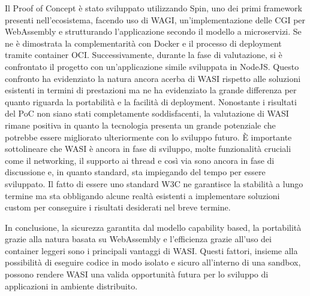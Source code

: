 Il Proof of Concept è stato sviluppato utilizzando Spin, uno dei primi framework presenti nell'ecosistema, facendo uso
di WAGI, un'implementazione delle CGI per WebAssembly e strutturando l'applicazione secondo il modello a microservizi.
Se ne è dimostrata la complementarità con Docker e il processo di deployment tramite container OCI. Successivamente,
durante la fase di valutazione, si è confrontato il progetto con un'applicazione simile sviluppata in NodeJS. Questo
confronto ha evidenziato la natura ancora acerba di WASI rispetto alle soluzioni esistenti in termini di prestazioni ma
ne ha evidenziato la grande differenza per quanto riguarda la portabilità e la facilità di deployment. Nonostante i
risultati del PoC non siano stati completamente soddisfacenti, la valutazione di WASI rimane positiva in quanto la
tecnologia presenta un grande potenziale che potrebbe essere migliorato ulteriormente con lo sviluppo futuro. È
importante sottolineare che WASI è ancora in fase di sviluppo, molte funzionalità cruciali come il networking, il
supporto ai thread e così via sono ancora in fase di discussione e, in quanto standard, sta impiegando del tempo per
essere sviluppato. Il fatto di essere uno standard W3C ne garantisce la stabilità a lungo termine ma sta obbligando
alcune realtà esistenti a implementare soluzioni custom per conseguire i risultati desiderati nel breve termine.

In conclusione, la sicurezza garantita dal modello capability based, la portabilità grazie alla natura basata su
WebAssembly e l'efficienza grazie all'uso dei container leggeri sono i principali vantaggi di WASI. Questi fattori,
insieme alla possibilità di eseguire codice in modo isolato e sicuro all'interno di una sandbox, possono rendere WASI
una valida opportunità futura per lo sviluppo di applicazioni in ambiente distribuito.